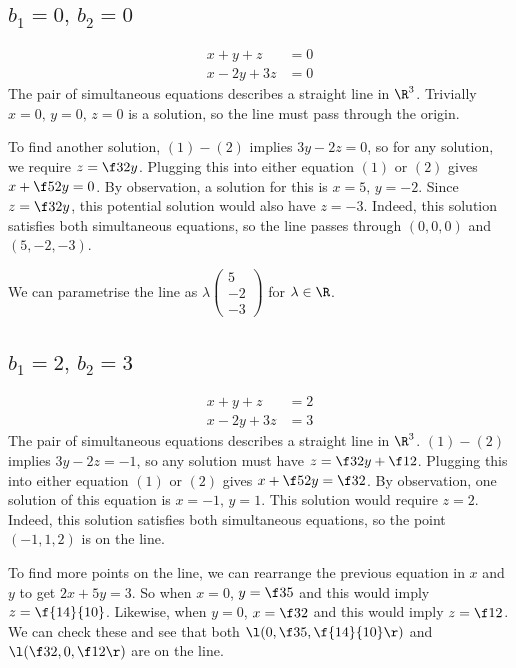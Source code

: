 \documentclass[a4paper]{article}
\begin{document}
\subsection{$b_1 = 0,\, b_2 = 0$} %

\begin{align*}
x + y + z &= 0 \tag{1} \\
x - 2y + 3z &= 0 \tag{2}
\end{align*}
The pair of simultaneous equations describes a straight line in $\R^3$. Trivially $x=0,\, y=0,\, z=0$ is a solution, so the line must pass through the origin.

To find another solution, $(1)-(2)$ implies $3y-2z=0$, so for any solution, we require $z = \f32 y$. Plugging this into either equation $(1)$ or $(2)$ gives $x + \f52 y = 0$. By observation, a solution for this is $x=5,\, y=-2$. Since $z=\f32 y$, this potential solution would also have $z=-3$. Indeed, this solution satisfies both simultaneous equations, so the line passes through $(0, 0, 0)$ and $(5, -2, -3)$.

We can parametrise the line as $\lambda \begin{pmatrix}5 \\ -2 \\ -3\end{pmatrix}$ for $\lambda \in \R$.

\subsection{$b_1 = 2,\, b_2 = 3$} %

\begin{align*}
x + y + z &= 2 \tag{1} \\
x - 2y + 3z &= 3 \tag{2}
\end{align*}
The pair of simultaneous equations describes a straight line in $\R^3$. $(1)-(2)$ implies $3y-2z=-1$, so any solution must have $z = \f32 y + \f12$. Plugging this into either equation $(1)$ or $(2)$ gives $x + \f52 y = \f32$. By observation, one solution of this equation is $x=-1,\, y=1$. This solution would require $z=2$. Indeed, this solution satisfies both simultaneous equations, so the point $(-1, 1, 2)$ is on the line.

To find more points on the line, we can rearrange the previous equation in $x$ and $y$ to get $2x+5y=3$. So when $x=0$, $y=\f35$ and this would imply $z=\f{14}{10}$. Likewise, when $y=0$, $x=\f32$ and this would imply $z=\f12$. We can check these and see that both $\l( 0, \f35, \f{14}{10} \r)$ and $\l( \f32, 0, \f12 \r)$ are on the line.
\end{document}
